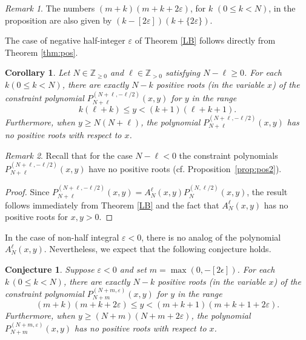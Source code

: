 \documentclass[11pt]{article}
\numberwithin{equation}{section}
\newcommand{\Z}{\mathbb{Z}} %
\newcommand{\e}{\varepsilon}
\newcommand{\cp}[2]{P^{(#1)}_{#2}} %
\newcommand{\floor}[1]{[#1]}
\newcommand{\fract}[1]{\{#1\}}
\theoremstyle{plain}
\newtheorem{cor}[thm]{Corollary}
\newtheorem{conject}[thm]{Conjecture}
\theoremstyle{definition}
\theoremstyle{remark}
\newtheorem{rem}{Remark}[section]
\begin{document}
\begin{rem}
  The numbers \((m+k)(m+k+2\e) \), for \(k\) \((0\leq k <N)\), in the proposition are also given
  by \((k - \floor{2\e})(k + \fract{2\e})\).
\end{rem}

The case of negative half-integer \(\e\) of Theorem \ref{LB} follows directly from Theorem \ref{thm:pos}.

\begin{cor}
  \label{cor:negepshalfinteger}
  Let \(N \in \Z_{\geq 0} \) and \(\ell \in \Z_{>0}\) satisfying \( N - \ell \geq 0\).
  For each \(k (0\leq k <N)\), there are exactly $N-k$ positive roots
  (in the variable $x$) of the constraint polynomial \(\cp{N+\ell,-\ell/2}{N+\ell}(x,y)\)
  for $y$ in the range
  \begin{equation*}
     k (\ell+k) \leq y < (k+1)(\ell+k+1).
   \end{equation*}
   Furthermore, when \( y \geq N (N+\ell) \), the polynomial
  \(\cp{N+\ell,-\ell/2}{N+\ell}(x,y)\) has no positive roots with respect to \(x\).
\end{cor}

\begin{rem}
  Recall that for the case \( N - \ell < 0\) the constraint polynomials \(\cp{N+\ell,-\ell/2}{N+\ell}(x,y)\)
  have no positive roots (cf. Proposition~\ref{prop:pos2}).
\end{rem}

\begin{proof}
  Since \(\cp{N+\ell,-\ell/2}{N+\ell}(x,y) = A_N^{\ell}(x,y) \cp{N,\ell/2}{N}(x,y)\), the result
  follows immediately from Theorem \ref{LB} and the fact that \(A_N^{\ell}(x,y)\) has
  no positive roots for \(x,y>0\). 
\end{proof}

In the case of non-half integral \(\e< 0\), there is no analog of the polynomial
\(A_N^{\ell}(x,y)\). Nevertheless, we expect that the following conjecture holds.

\begin{conject}
  Suppose \(\e < 0 \) and set \(m = \max(0,- \floor{2\epsilon}) \).
  For each \(k \, (0\leq k <N)\), there are exactly $N-k$ positive roots
  (in the variable $x$) of the constraint polynomial \(\cp{N+m,\e}{N+m}(x,y)\)
  for $y$ in the range
  \begin{equation*}
     (m+k)(m+k+2\e) \leq y < (m+k+1)(m+k+1 +2\e).
   \end{equation*}
   Furthermore, when \( y \geq (N+m)(N+m +2\e) \), the polynomial
  \(\cp{N+m,\e}{N+m}(x,y)\) has no positive roots with respect to \(x\).
\end{conject}
\end{document}
